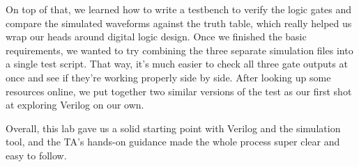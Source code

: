 On top of that, we learned how to write a testbench to verify the logic gates and compare the simulated waveforms against the truth table, which really helped us wrap our heads around digital logic design. Once we finished the basic requirements, we wanted to try combining the three separate simulation files into a single test script. That way, it’s much easier to check all three gate outputs at once and see if they’re working properly side by side. After looking up some resources online, we put together two similar versions of the test as our first shot at exploring Verilog on our own.

Overall, this lab gave us a solid starting point with Verilog and the simulation tool, and the TA’s hands-on guidance made the whole process super clear and easy to follow.